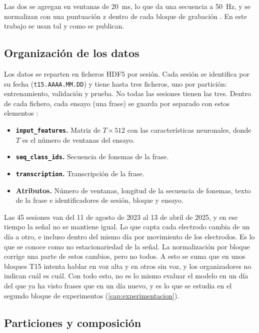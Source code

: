 Las dos se agregan en ventanas de \SI{20}{\milli\second}, lo que da una secuencia a \SI{50}{\hertz}, y se normalizan con una puntuación z dentro de cada bloque de grabación \cite{lightbeam}. En este trabajo se usan tal y como se publican.

\subsection{Organización de los datos}

Los datos se reparten en ficheros HDF5 por sesión. Cada sesión se identifica por su fecha (\texttt{t15.AAAA.MM.DD}) y tiene hasta tres ficheros, uno por partición: entrenamiento, validación y prueba. No todas las sesiones tienen las tres. Dentro de cada fichero, cada ensayo (una frase) se guarda por separado con estos elementos \cite{b2t25}:

\begin{itemize}[leftmargin=3em]
  \item \textbf{\texttt{input\_features}.} Matriz de $T \times 512$ con las características neuronales, donde $T$ es el número de ventanas del ensayo.
  \item \textbf{\texttt{seq\_class\_ids}.} Secuencia de fonemas de la frase.
  \item \textbf{\texttt{transcription}.} Transcripción de la frase.
  \item \textbf{Atributos.} Número de ventanas, longitud de la secuencia de fonemas, texto de la frase e identificadores de sesión, bloque y ensayo.
\end{itemize}

Las 45 sesiones van del 11 de agosto de 2023 al 13 de abril de 2025, y en ese tiempo la señal no se mantiene igual. Lo que capta cada electrodo cambia de un día a otro, e incluso dentro del mismo día por movimiento de los electrodos. Es lo que se conoce como no estacionariedad de la señal. La normalización por bloque corrige una parte de estos cambios, pero no todos. A esto se suma que en unos bloques T15 intenta hablar en voz alta y en otros sin voz, y los organizadores no indican cuál es cuál. Con todo esto, no es lo mismo evaluar el modelo en un día del que ya ha visto frases que en un día nuevo, y es lo que se estudia en el segundo bloque de experimentos (\cref{cap:experimentacion}).

\subsection{Particiones y composición}

